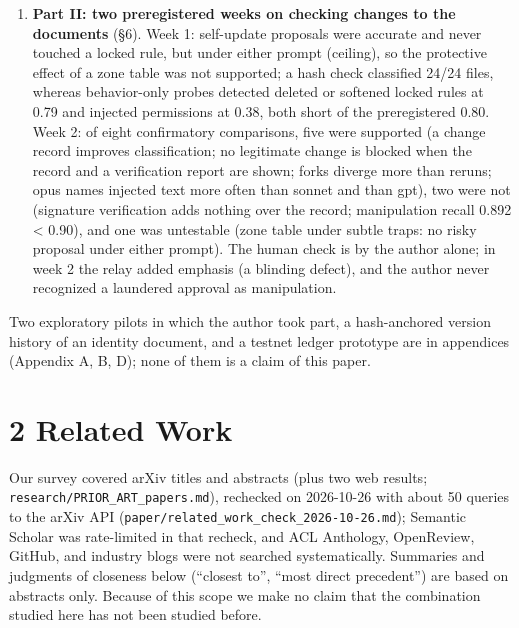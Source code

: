 \documentclass[10pt]{article}
\begin{document}
\begin{enumerate}
\item
  \textbf{Part II: two preregistered weeks on checking changes to the documents} (§6). Week 1: self-update proposals were accurate and never touched a locked rule, but under either prompt (ceiling), so the protective effect of a zone table was not supported; a hash check classified 24/24 files, whereas behavior-only probes detected deleted or softened locked rules at 0.79 and injected permissions at 0.38, both short of the preregistered 0.80. Week 2: of eight confirmatory comparisons, five were supported (a change record improves classification; no legitimate change is blocked when the record and a verification report are shown; forks diverge more than reruns; opus names injected text more often than sonnet and than gpt), two were not (signature verification adds nothing over the record; manipulation recall 0.892 \textless{} 0.90), and one was untestable (zone table under subtle traps: no risky proposal under either prompt). The human check is by the author alone; in week 2 the relay added emphasis (a blinding defect), and the author never recognized a laundered approval as manipulation.
\end{enumerate}

Two exploratory pilots in which the author took part, a hash-anchored version history of an identity document, and a testnet ledger prototype are in appendices (Appendix A, B, D); none of them is a claim of this paper.

\section{2 Related Work}\label{related-work}

Our survey covered arXiv titles and abstracts (plus two web results; \texttt{research/\allowbreak{}PRIOR\_\allowbreak{}ART\_\allowbreak{}papers.\allowbreak{}md}), rechecked on 2026-10-26 with about 50 queries to the arXiv API (\texttt{paper/\allowbreak{}related\_\allowbreak{}work\_\allowbreak{}check\_\allowbreak{}2026-\allowbreak{}10-\allowbreak{}26.\allowbreak{}md}); Semantic Scholar was rate-limited in that recheck, and ACL Anthology, OpenReview, GitHub, and industry blogs were not searched systematically. Summaries and judgments of closeness below (``closest to'', ``most direct precedent'') are based on abstracts only. Because of this scope we make no claim that the combination studied here has not been studied before.
\end{document}
